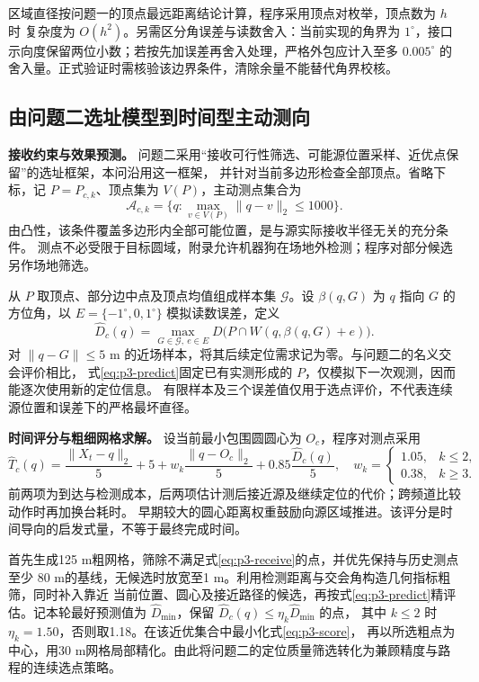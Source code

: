 区域直径按问题一的顶点最远距离结论计算，程序采用顶点对枚举，顶点数为 $h$ 时
复杂度为 $O(h^2)$。另需区分角误差与读数舍入：当前实现的角界为
$1^\circ$，接口示向度保留两位小数；若按先加误差再舍入处理，严格外包应计入至多
$0.005^\circ$ 的舍入量。正式验证时需核验该边界条件，清除余量不能替代角界校核。

\subsection{由问题二选址模型到时间型主动测向}

\textbf{接收约束与效果预测。}
问题二采用“接收可行性筛选、可能源位置采样、近优点保留”的选址框架，本问沿用这一框架，
并针对当前多边形检查全部顶点。省略下标，记 $P=P_{c,k}$、顶点集为 $V(P)$，主动测点集合为
\begin{equation}\label{eq:p3-receive}
\mathcal A_{c,k}=\{q:\max_{v\in V(P)}\|q-v\|_2\le1000\}.
\end{equation}
由凸性，该条件覆盖多边形内全部可能位置，是与源实际接收半径无关的充分条件。
测点不必受限于目标圆域，附录允许机器狗在场地外检测；程序对部分候选另作场地筛选。

从 $P$ 取顶点、部分边中点及顶点均值组成样本集 $\mathcal G$。设 $\beta(q,G)$ 为 $q$ 指向
$G$ 的方位角，以 $E=\{-1^\circ,0,1^\circ\}$ 模拟读数误差，定义
\begin{equation}\label{eq:p3-predict}
\widehat D_c(q)=\max_{G\in\mathcal G,\ e\in E}
D\bigl(P\cap W(q,\beta(q,G)+e)\bigr).
\end{equation}
对 $\|q-G\|\le5$ m 的近场样本，将其后续定位需求记为零。与问题二的名义交会评价相比，
式\eqref{eq:p3-predict}固定已有实测形成的 $P$，仅模拟下一次观测，因而能逐次使用新的定位信息。
有限样本及三个误差值仅用于选点评价，不代表连续源位置和误差下的严格最坏直径。

\textbf{时间评分与粗细网格求解。}
设当前最小包围圆圆心为 $O_c$，程序对测点采用
\begin{equation}\label{eq:p3-score}
\widehat T_c(q)=\frac{\|X_t-q\|_2}{5}+5
+w_k\frac{\|q-O_c\|_2}{5}+0.85\frac{\widehat D_c(q)}{5},
\quad
w_k=\begin{cases}1.05,&k\le2,\\0.38,&k\ge3.\end{cases}
\end{equation}
前两项为到达与检测成本，后两项估计测后接近源及继续定位的代价；跨频道比较动作时再加换台耗时。
早期较大的圆心距离权重鼓励向源区域推进。该评分是时间导向的启发式量，不等于最终完成时间。

首先生成125 m粗网格，筛除不满足式\eqref{eq:p3-receive}的点，并优先保持与历史测点至少
80 m的基线，无候选时放宽至1 m。利用检测距离与交会角构造几何指标粗筛，同时补入靠近
当前位置、圆心及接近路径的候选，再按式\eqref{eq:p3-predict}精评估。记本轮最好预测值为
$\widehat D_{\min}$，保留 $\widehat D_c(q)\le\eta_k\widehat D_{\min}$ 的点，
其中 $k\le2$ 时 $\eta_k=1.50$，否则取1.18。在该近优集合中最小化式\eqref{eq:p3-score}，
再以所选粗点为中心，用30 m网格局部精化。由此将问题二的定位质量筛选转化为兼顾精度与路程的连续选点策略。

